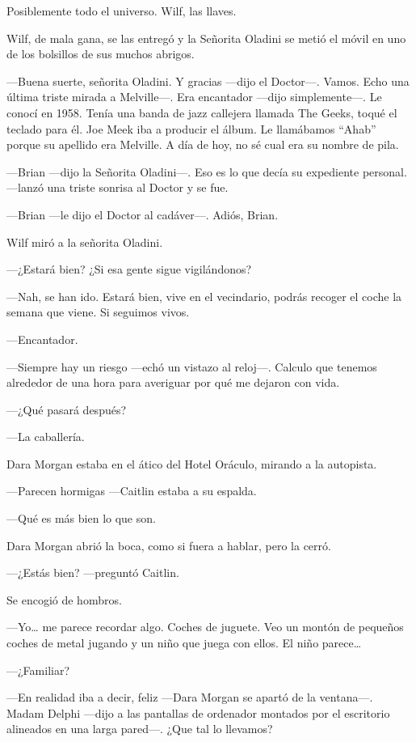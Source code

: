 Posiblemente todo el universo. Wilf, las llaves.

Wilf, de mala gana, se las entregó y la Señorita Oladini se metió el
móvil en uno de los bolsillos de sus muchos abrigos.

---Buena suerte, señorita Oladini. Y gracias ---dijo el Doctor---.
Vamos. Echo una última triste mirada a Melville---. Era encantador
---dijo simplemente---. Le conocí en 1958. Tenía una banda de jazz
callejera llamada The Geeks, toqué el teclado para él. Joe Meek iba a
producir el álbum. Le llamábamos ``Ahab'' porque su apellido era
Melville. A día de hoy, no sé cual era su nombre de pila.

---Brian ---dijo la Señorita Oladini---. Eso es lo que decía su
expediente personal. ---lanzó una triste sonrisa al Doctor y se fue.

---Brian ---le dijo el Doctor al cadáver---. Adiós, Brian. ~

Wilf miró a la señorita Oladini.

---¿Estará bien? ¿Si esa gente sigue vigilándonos?

---Nah, se han ido. Estará bien, vive en el vecindario, podrás recoger
el coche la semana que viene. Si seguimos vivos.

---Encantador.

---Siempre hay un riesgo ---echó un vistazo al reloj---. Calculo que
tenemos alrededor de una hora para averiguar por qué me dejaron con
vida.

---¿Qué pasará después?

---La caballería.

Dara Morgan estaba en el ático del Hotel Oráculo, mirando a la
autopista.

---Parecen hormigas ---Caitlin estaba a su espalda.

---Qué es más bien lo que son.

Dara Morgan abrió la boca, como si fuera a hablar, pero la cerró.

---¿Estás bien? ---preguntó Caitlin.

Se encogió de hombros.

---Yo\ldots{} me parece recordar algo. Coches de juguete. Veo un montón
de pequeños coches de metal jugando y un niño que juega con ellos. El
niño parece\ldots{}

---¿Familiar?

---En realidad iba a decir, feliz ---Dara Morgan se apartó de la
ventana---. Madam Delphi ---dijo a las pantallas de ordenador montados
por el escritorio alineados en una larga pared---. ¿Que tal lo
llevamos?

